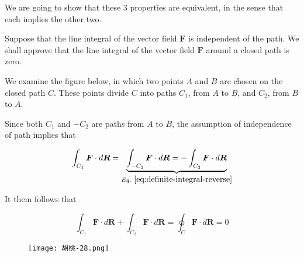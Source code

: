 We are going to show that these 3 properties are equivalent, in the sense that each implies the other two.

Suppose that the line integral of the vector field $\boldsymbol{F}$ is independent of the path. We shall approve that
the line integral of the vector field $\boldsymbol{F}$ around a closed path is zero.

We examine the figure below, in which two points $A$ and $B$ are chosen on the closed path $C$. These points divide $C$
into paths $C_1$, from $A$ to $B$, and $C_2$, from $B$ to $A$.

\begin{figure}[H]
    \centering
\end{figure}

Since both $C_1$ and $-C_2$ are paths from $A$ to $B$,
the assumption of independence of path implies that

\begin{equation}
    \int_{C_1}\boldsymbol{F}\cdot d\boldsymbol{R} = \underbrace{\int_{-C_2}\boldsymbol{F}\cdot d\boldsymbol{R} = -\int_{C_2}\boldsymbol{F}\cdot d\boldsymbol{R}}_{Eq.~\ref{eq:definite-integral-reverse}}
\end{equation}

It them follows that

\begin{equation}
    \int_{C_1}\boldsymbol{F}\cdot d\boldsymbol{R} + \int_{C_2}\boldsymbol{F}\cdot d\boldsymbol{R} = \oint_C\boldsymbol{F}\cdot d\boldsymbol{R} = 0
\end{equation}

\begin{figure}[H]
    \begin{flushright}
        \texttt{[image: 胡桃-28.png]}
    \end{flushright}
\end{figure}

